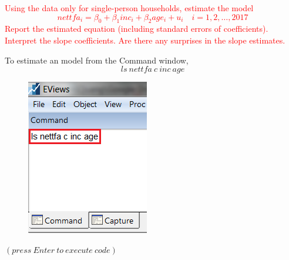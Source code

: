 \documentclass[12pt]{report}
\begin{document}
\vspace{-\baselineskip}
\noindent \textcolor{red}{Using the data only for single-person households, estimate the model $$nettfa_i = \beta_0 +\beta_1inc_i + \beta_2age_i + u_i \quad i=1,2,\dots,2017$$ Report the estimated equation (including standard errors of coefficients). Interpret the slope coefficients. Are there any surprises in the slope estimates.}

\noindent To estimate an model from the Command window,
$$ls\ nettfa\ c\ inc\ age$$
\begin{figure}[H]
	\centering
	\includegraphics{tute6_q3_4}
\end{figure}
\vspace{-\baselineskip}\centering $(press\ Enter\ to\ execute\ code)$
\justify 
\end{document}
